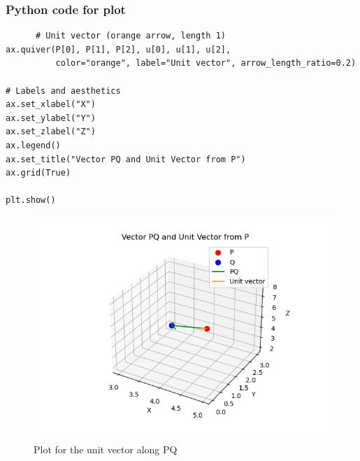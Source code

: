 \documentclass{beamer}
\begin{document}
 \begin{frame}[fragile]
       \frametitle{Python code for plot}
       \begin{lstlisting}
      # Unit vector (orange arrow, length 1)
ax.quiver(P[0], P[1], P[2], u[0], u[1], u[2],
          color="orange", label="Unit vector", arrow_length_ratio=0.2)

# Labels and aesthetics
ax.set_xlabel("X")
ax.set_ylabel("Y")
ax.set_zlabel("Z")
ax.legend()
ax.set_title("Vector PQ and Unit Vector from P")
ax.grid(True)

plt.show()
    \end{lstlisting}
 \end{frame}
 \begin{figure}
     \centering
     \includegraphics[width=0.7\linewidth]{figs/Figure2.png}
     \caption{Plot for the unit vector along PQ}
     \label{fig2}
 \end{figure}
\end{document}
